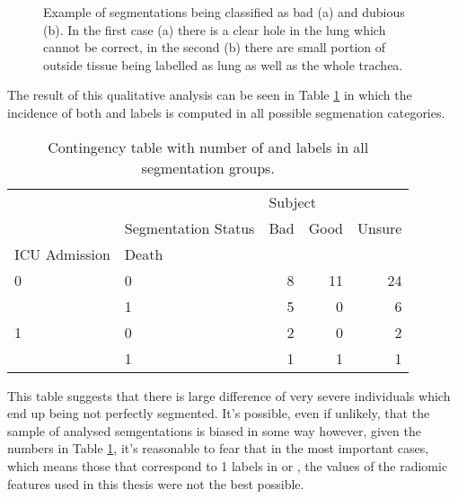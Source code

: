 \begin{figure}[H]
\centering
	\newline
        \caption{Example of segmentations being classified as bad (a) and dubious (b). In the first case (a) there is a clear hole in the lung which cannot be correct, in the second (b) there are small portion of outside tissue being labelled as lung as well as the whole trachea.}\label{fig:ExampleSeg}
\end{figure}

The result of this qualitative analysis can be seen in Table \ref{tab:ContingencyTableSegm} in which the incidence of both \death and \icu labels is computed in all possible segmenation categories.

\begin{table}
\centering
\caption{Contingency table with number of \death and \icu labels in all segmentation groups. \label{tab:ContingencyTableSegm}}
\begin{tabular}{llrrr}
\toprule
  & {} & \multicolumn{3}{l}{Subject} \\
  & Segmentation Status &     Bad & Good & Unsure \\
ICU Admission & Death &         &      &        \\
\midrule
0 & 0 &       8 &   11 &     24 \\
  & 1 &       5 &    0 &      6 \\
1 & 0 &       2 &    0 &      2 \\
  & 1 &       1 &    1 &      1 \\
\bottomrule
\end{tabular}
\end{table}

This table suggests that there is large difference of very severe individuals which end up being not perfectly segmented.
It's possible, even if unlikely, that the sample of analysed semgentations is biased in some way however, given the numbers in Table \ref{tab:ContingencyTableSegm}, it's reasonable to fear that in the most important cases, which means those that correspond to 1 labels in \death or \icu, the values of the radiomic features used in this thesis were not the best possible. 
